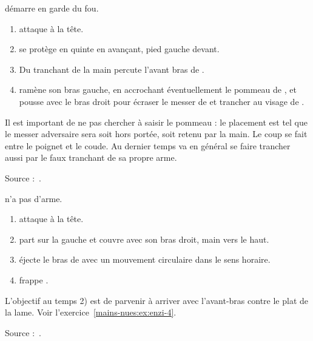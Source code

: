 \begin{technique}

\D démarre en garde du fou.

\begin{enumerate}
	\item \A attaque à la tête.
	\item \D se protège en quinte en avançant, pied gauche devant.
	\item Du tranchant de la main \D percute l'avant bras de \A.
	\item \D ramène son bras gauche, en accrochant éventuellement le pommeau de \A, et pousse avec le bras droit pour écraser le messer de \A et trancher au visage de \A.
\end{enumerate}

Il est important de ne pas chercher à saisir le pommeau : le placement est tel que le messer adversaire sera soit hors portée, soit retenu par la main.
Le coup se fait entre le poignet et le coude.
Au dernier temps \A va en général se faire trancher aussi par le faux tranchant de sa propre arme.

Source :~\cite{enzi:dijon:messer_inner:2015}.

\end{technique}


\begin{technique}

\D n'a pas d'arme.

\begin{enumerate}
	\item \A attaque à la tête.
	\item \D part sur la gauche et couvre avec son bras droit, main vers le haut.
	\item \D éjecte le bras de \A avec un mouvement circulaire dans le sens horaire.
	\item \D frappe \A.
\end{enumerate}

L'objectif au temps 2) est de parvenir à arriver avec l'avant-bras contre le plat de la lame.
Voir l'exercice~\ref{mains-nues:ex:enzi-4}.

Source :~\cite{enzi:dijon:messer_inner:2015}.

\end{technique}


